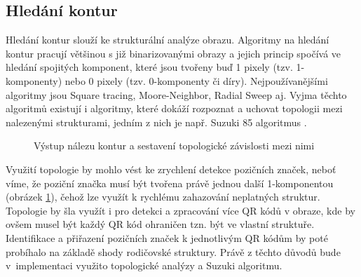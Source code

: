 \subsection{Hledání kontur}
\label{hledaniKontur}

Hledání kontur slouží ke strukturální analýze obrazu. Algoritmy na hledání
kontur pracují většinou s již binarizovanými obrazy a jejich princip spočívá ve
hledání spojitých komponent, které jsou tvořeny buď 1 pixely (tzv. 1-komponenty)
nebo 0 pixely (tzv. 0-komponenty či díry). Nejpoužívanějšími algoritmy jsou Square tracing,
Moore-Neighbor, Radial Sweep aj. Vyjma těchto algoritmů existují i algoritmy,
které dokáží rozpoznat a uchovat topologii mezi nalezenými strukturami, jedním
z nich je např. Suzuki 85 algoritmus \cite{suzukiLit}.

\begin{figure}[H]
  \begin{center}
    \caption{Výstup nálezu kontur a sestavení topologické závislosti mezi nimi}
    \label{ContourTopology}
  \end{center}
\end{figure}

Využití topologie by mohlo vést ke zrychlení detekce pozičních značek, neboť
víme, že poziční značka musí být tvořena právě jednou další 1-komponentou
(obrázek \ref{ContourTopology}), čehož lze využít k rychlému zahazování
neplatných struktur. Topologie by šla využít i pro detekci a zpracování více QR
kódů v obraze, kde by ovšem musel být každý QR kód ohraničen tzn. být ve vlastní struktuře. Identifikace a přiřazení
pozičních značek k jednotlivým QR kódům by poté probíhalo na základě shody
rodičovské struktury. Právě z těchto důvodů bude v~implementaci využito
topologické analýzy a Suzuki algoritmu.

